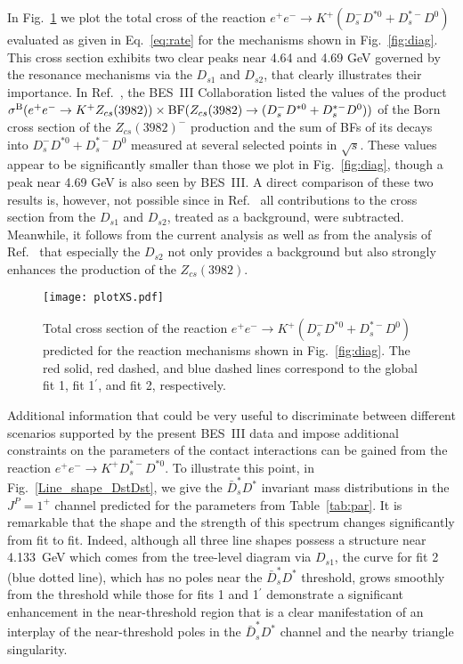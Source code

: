 \documentclass[preprint,12pt,3p]{elsarticle}
\begin{document}
{ In Fig.~\ref{Fig:XS} we plot the total cross of the reaction $e^+e^-\to K^+(D_s^-D^{*0}+D_s^{*-}D^0)$ evaluated as given in Eq.~\eqref{eq:rate} 
for the mechanisms shown in Fig.~\ref{fig:diag}. This cross section exhibits two clear peaks near 4.64 and 4.69 GeV governed by the resonance 
mechanisms via the $D_{s1}$ and $D_{s2}$, that clearly illustrates their importance. In Ref.~\cite{BESIII:2020qkh}, the BES~III Collaboration listed the values of the product $\sigma^{\rm B} (e^+e^-\to K^+ Z_{cs}(3982)) \times {\rm BF}(Z_{cs}(3982)\to (D_s^-D^{*0}+D_s^{*-}D^0))$ of the Born cross section of the $Z_{cs}(3982)^-$ production and the sum of BFs of its decays into $D_s^-D^{*0}+D_s^{*-}D^0$ measured at several selected points in $\sqrt{s}$. These values appear to be significantly smaller than those we plot in Fig.~\ref{fig:diag}, though a peak near 4.69 GeV is also seen by BES~III. A direct comparison of these two results is, however, not possible since in Ref.~\cite{BESIII:2020qkh} all contributions to the cross section from the $D_{s1}$ and $D_{s2}$, treated as a background, were subtracted. Meanwhile, it  follows from the current analysis 
as well as  from the analysis of Ref.~\cite{Yang:2020nrt} that especially the $D_{s2}$ not only provides a background but also strongly enhances the production of the $Z_{cs}(3982)$.}

\begin{figure}[t!]
\begin{center}
\texttt{[image: plotXS.pdf]}
\caption{Total cross section of the reaction $e^+e^-\to K^+(D_s^-D^{*0}+D_s^{*-}D^0)$ predicted for the reaction mechanisms shown in Fig.~\ref{fig:diag}.
The red solid, red dashed, and blue dashed lines correspond to the global fit 1, fit 1$^\prime$, and fit 2, respectively. 
\label{Fig:XS}}
\end{center}
\end{figure}
 
Additional information that could be very useful to discriminate between different scenarios supported by the present BES~III data and impose additional constraints on the parameters of the contact interactions can be gained from the reaction $e^+e^-\to K^+D^{*-}_sD^{*0}$. To illustrate this point, in Fig.~\ref{Line_shape_DstDst}, we give the $\bar{D}^*_sD^*$ invariant mass distributions in the $J^{P}=1^+$ channel predicted for the parameters from Table~\ref{tab:par}. It is remarkable that the shape and the strength of this spectrum changes significantly from fit to fit. Indeed, although all three line shapes possess a structure near 4.133~GeV which comes from the tree-level diagram via $D_{s1}$, the curve for fit 2 (blue dotted line), which has no poles near the $\bar{D}^*_sD^*$ threshold, grows smoothly from the threshold while those for fits 1 and 1$^\prime$ demonstrate a significant enhancement in the near-threshold region that is a clear manifestation of an interplay of the near-threshold poles in the $\bar{D}^*_sD^*$ channel and the nearby triangle singularity. 
\end{document}
